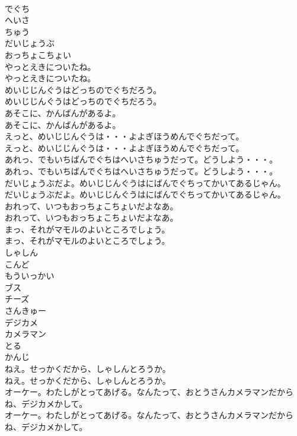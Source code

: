 \documentclass[8pt]{extreport}
\begin{document}
\begin{CJK}{UTF8}{min}
\\	でぐち
\\	へいさ
\\	ちゅう
\\	だいじょうぶ
\\	おっちょこちょい
\\	やっとえきについたね。
\\	やっとえきについたね。
\\	めいじじんぐうはどっちのでぐちだろう。
\\	めいじじんぐうはどっちのでぐちだろう。
\\	あそこに、かんばんがあるよ。
\\	あそこに、かんばんがあるよ。
\\	えっと、めいじじんぐうは・・・よよぎほうめんでぐちだって。
\\	えっと、めいじじんぐうは・・・よよぎほうめんでぐちだって。
\\	あれっ、でもいちばんでぐちはへいさちゅうだって。どうしよう・・・。
\\	あれっ、でもいちばんでぐちはへいさちゅうだって。どうしよう・・・。
\\	だいじょうぶだよ。めいじじんぐうはにばんでぐちってかいてあるじゃん。
\\	だいじょうぶだよ。めいじじんぐうはにばんでぐちってかいてあるじゃん。
\\	おれって、いつもおっちょこちょいだよなあ。
\\	おれって、いつもおっちょこちょいだよなあ。
\\	まっ、それがマモルのよいところでしょう。
\\	まっ、それがマモルのよいところでしょう。
\\	しゃしん
\\	こんど
\\	もういっかい
\\	ブス
\\	チーズ
\\	さんきゅー
\\	デジカメ
\\	カメラマン
\\	とる
\\	かんじ
\\	ねえ。せっかくだから、しゃしんとろうか。
\\	ねえ。せっかくだから、しゃしんとろうか。
\\	オーケー。わたしがとってあげる。なんたって、おとうさんカメラマンだからね、デジカメかして。
\\	オーケー。わたしがとってあげる。なんたって、おとうさんカメラマンだからね、デジカメかして。

\end{CJK}
\end{document}
